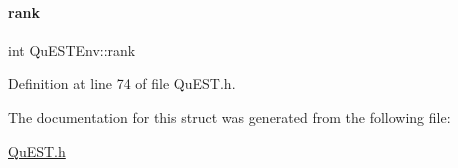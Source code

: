\mbox{\label{structQuESTEnv_aa648bb336cf8598467cb62db00b9cee8}} 
\paragraph{\texorpdfstring{rank}{rank}}
{\footnotesize\ttfamily int Qu\+E\+S\+T\+Env\+::rank}



Definition at line 74 of file Qu\+E\+S\+T.\+h.



The documentation for this struct was generated from the following file\+:\begin{DoxyCompactItemize}
\item 
\mbox{\hyperlink{QuEST_8h}{Qu\+E\+S\+T.\+h}}\end{DoxyCompactItemize}
